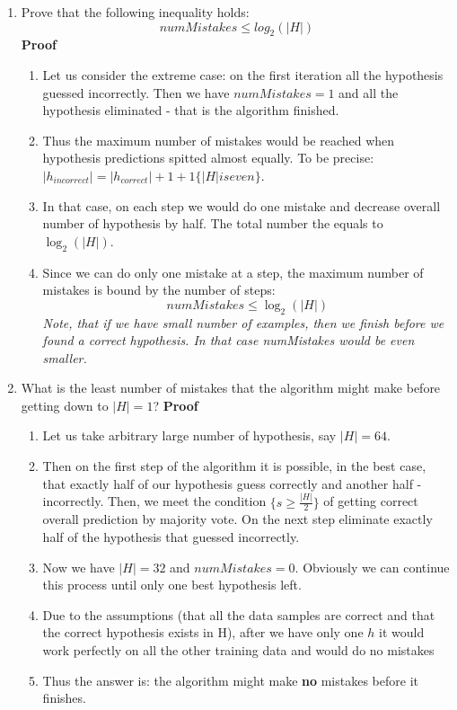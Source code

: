 \documentclass{article}
\begin{document}
	\begin{enumerate}
		\item Prove that the following inequality holds:
		$$numMistakes \le log_2(|H|)$$		
		\textbf{Proof}
		\begin{enumerate}
			\item Let us consider the extreme case: on the first iteration all the hypothesis guessed incorrectly. Then we have $numMistakes=1$ and all the hypothesis eliminated - that is the algorithm finished.
			\item Thus the maximum number of mistakes would be reached when hypothesis predictions spitted almost equally. To be precise: $|h_{incorrect}|=|h_{correct}| + 1 + 1\{|H| is even\}$. 
			\item In that case, on each step we would do one mistake and decrease overall number of hypothesis by half. The total number the equals to $\log_2(|H|)$.
			\item Since we can do only one mistake at a step, the maximum number of mistakes is bound by the number of steps: $$numMistakes \le \log_2(|H|)$$
			\textit{Note, that if we have small number of examples, then we finish before we found a correct hypothesis. In that case numMistakes would be even smaller. }
						
		\end{enumerate}
		
		\item What is the least number of mistakes that the algorithm might make before getting down to $|H| = 1$?
		\textbf{Proof}
		\begin{enumerate}
			\item Let us take arbitrary large number of hypothesis, say $|H|=64$.
			\item Then on the first step of the algorithm it is possible, in the best case, that exactly half of our hypothesis guess correctly and another half - incorrectly. Then, we meet the condition $\{s \ge \frac{|H|}{2}\}$ of getting correct overall prediction by majority vote. On the next step eliminate exactly half of the hypothesis that guessed incorrectly.
			\item Now we have $|H|=32$ and $numMistakes=0$. Obviously we can continue this process until only one best hypothesis left. 
			\item Due to the assumptions (that all the data samples are correct and that the correct hypothesis exists in H), after we have only one $h$ it would work perfectly on all the other training data and would do no mistakes
			\item Thus the answer is: the algorithm might make \textbf{no} mistakes before it finishes.
			
		\end{enumerate}
		
	\end{enumerate}
\end{document}
